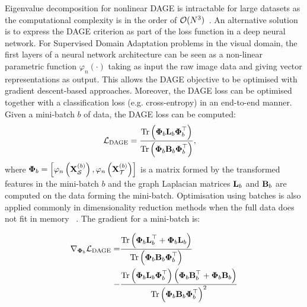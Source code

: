\documentclass[journal]{IEEEtran}
\renewcommand{\matrix}[1]{\ensuremath{\bm{\mathbf{\uppercase{#1}}}}}
\newcommand{\mX}{\matrix{x}}
\newcommand{\Src}{\mathcal{S}} \newcommand{\Tgt}{\mathcal{T}}
\newcommand{\tr}{\text{Tr}}
\begin{document}
Eigenvalue decomposition for nonlinear DAGE is intractable for large datasets as the computational complexity is in the order of $\concept{O}(N^3)$~\cite{pan1999eigencomplexity}. An alternative solution is to express the DAGE criterion as part of the loss function in a deep neural network. For Supervised Domain Adaptation problems in the visual domain, the first layers of a neural network architecture can be seen as a non-linear parametric function $\varphi_n(\cdot)$ taking as input the raw image data and giving vector representations  as output. This allows the DAGE objective to be optimised with gradient descent-based approaches. Moreover, the DAGE loss can be optimised together with a classification loss (e.g. cross-entropy) in an end-to-end manner. Given a mini-batch $b$ of data, the DAGE loss can be computed:
\begin{align}
  \concept{L}_{\text{DAGE}}
  &=
  \frac{
    \tr
    \left(
    \matrix{\Phi}_{b}
    \matrix{L}_b
    \matrix{\Phi}_{b}^\top
    \right)
  }{
    \tr
    \left(
    \matrix{\Phi}_{b}
    \matrix{B}_b
    \matrix{\Phi}_{b}^\top
    \right)
  },
  \label{eq:dage_loss}
\end{align}
where 
$
\matrix{\Phi}_b
=
    \left[
      \varphi_n \left(\mX^{(b)}_\Src \right) ,
      \varphi_n \left(\mX^{(b)}_\Tgt \right)
    \right]
$
is a matrix formed by the transformed features in the mini-batch $b$ and the graph Laplacian matrices $\matrix{L}_b$ and $\matrix{B}_b$ are computed on the data forming the mini-batch. 
Optimisation using batches is also applied commonly in dimensionality reduction methods when the full data does not fit in memory ~\cite{maaten2019learning, passalis2018dimensionality, gheche2019stochastic}.
The gradient for a mini-batch is:

\begin{align}
  \nabla_{\matrix{\Phi}_b} \mathcal{L}_{\text{DAGE}}
  =&
  \frac{
    \tr 
    \left(
      \matrix{\Phi}_b
      \matrix{L}_b^\top
      +
      \matrix{\Phi}_b
      \matrix{L}_b
    \right)
  }{
      \tr 
      \left( 
        \matrix{\Phi}_b
        \matrix{B} _b
        \matrix{\Phi}_b^\top 
      \right)
  }
  \notag
  \\
  -&
  \frac{
    \tr 
      \left(
        \matrix{\Phi}_b
        \matrix{L}_b
        \matrix{\Phi}_b^\top
      \right)
      \left(
        \matrix{\Phi}_b
        \matrix{B}_b^{\top}
        +
        \matrix{\Phi}_b
        \matrix{B}_b
      \right)
  }{
      \tr 
      \left( 
        \matrix{\Phi}_b
        \matrix{B}_b
        \matrix{\Phi}_b^\top 
      \right)^2
  }
\end{align}
\end{document}
